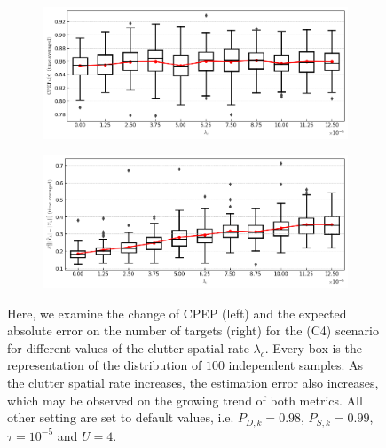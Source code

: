 \begin{figure}
    \centering
    \begin{subfigure}[]{0.48\linewidth}
        \centering
        \includegraphics[width=\linewidth]{figures/c4-clutter-cpep.png}
    \end{subfigure}
    \hfill
    \begin{subfigure}[]{0.48\linewidth}
        \centering
        \includegraphics[width=\linewidth]{figures/c4-clutter-eae.png}
    \end{subfigure}
  \caption[(C4). Change of performance depending on the clutter rate.]{Here, we examine the change of CPEP (left) and the expected absolute error on the number of targets (right) for the (C4) scenario for different values of the clutter spatial rate $\lambda_c$. Every box is the representation of the distribution of $100$ independent samples. As the clutter spatial rate increases, the estimation error also increases, which may be observed on the growing trend of both metrics. All other setting are set to default values, i.e. $P_{D,k} = 0.98$, $P_{S,k} = 0.99$, $\tau = 10^{-5}$ and $U = 4$.}
  \label{fig:c4-clutter}
\end{figure}


